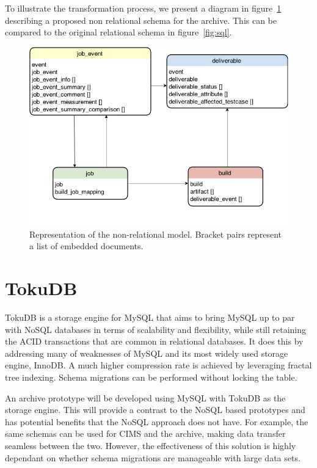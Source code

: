 To illustrate the transformation process, we present a diagram in figure~\ref{fig:nosql} describing a proposed non relational schema for the archive. This can be compared to the original relational schema in figure~\ref{fig:sql}.

\begin{figure}[h!]
\centering
\includegraphics[scale=0.5]{figure/nosql.png}
\caption{Representation of the non-relational model. Bracket pairs represent a list of embedded documents.}
\label{fig:nosql}
\end{figure}

\section{TokuDB}
TokuDB is a storage engine for MySQL that aims to bring MySQL up to par with NoSQL databases in terms of scalability and flexibility, while still retaining the ACID transactions that are common in relational databases. It does this by addressing many of weaknesses of MySQL and its most widely used storage engine, InnoDB. A much higher compression rate is achieved by leveraging fractal tree indexing. Schema migrations can be performed without locking the table.

An archive prototype will be developed using MySQL with TokuDB as the storage engine. This will provide a contrast to the NoSQL based prototypes and has potential benefits that the NoSQL approach does not have. For example, the same schemas can be used for CIMS and the archive, making data transfer seamless between the two. However, the effectiveness of this solution is highly dependant on whether schema migrations are manageable with large data sets.

